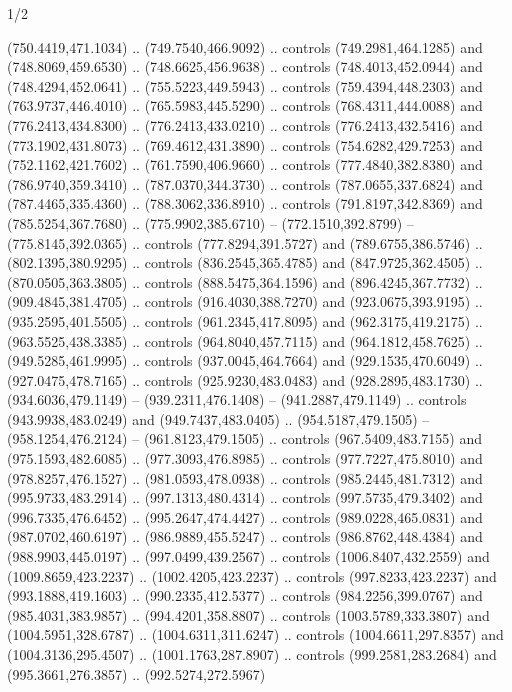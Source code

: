 \begin{flagdescription}{1/2}
\begin{scope}[shift={(2*\flaglength/3-0.25*\rb,0.51333\flagwidth)},scale=0.001715\flagwidth*\stretchfactor]
\begin{scope}[y=-1pt, x=1pt,cm={{1.04354,0.0,0.0,1.01818,(-827,-297)}}]
\begin{scope}[fill=gold]
  (750.4419,471.1034) .. (749.7540,466.9092) .. controls (749.2981,464.1285) and
  (748.8069,459.6530) .. (748.6625,456.9638) .. controls (748.4013,452.0944) and
  (748.4294,452.0641) .. (755.5223,449.5943) .. controls (759.4394,448.2303) and
  (763.9737,446.4010) .. (765.5983,445.5290) .. controls (768.4311,444.0088) and
  (776.2413,434.8300) .. (776.2413,433.0210) .. controls (776.2413,432.5416) and
  (773.1902,431.8073) .. (769.4612,431.3890) .. controls (754.6282,429.7253) and
  (752.1162,421.7602) .. (761.7590,406.9660) .. controls (777.4840,382.8380) and
  (786.9740,359.3410) .. (787.0370,344.3730) .. controls (787.0655,337.6824) and
  (787.4465,335.4360) .. (788.3062,336.8910) .. controls (791.8197,342.8369) and
  (785.5254,367.7680) .. (775.9902,385.6710) -- (772.1510,392.8799) --
  (775.8145,392.0365) .. controls (777.8294,391.5727) and (789.6755,386.5746) ..
  (802.1395,380.9295) .. controls (836.2545,365.4785) and (847.9725,362.4505) ..
  (870.0505,363.3805) .. controls (888.5475,364.1596) and (896.4245,367.7732) ..
  (909.4845,381.4705) .. controls (916.4030,388.7270) and (923.0675,393.9195) ..
  (935.2595,401.5505) .. controls (961.2345,417.8095) and (962.3175,419.2175) ..
  (963.5525,438.3385) .. controls (964.8040,457.7115) and (964.1812,458.7625) ..
  (949.5285,461.9995) .. controls (937.0045,464.7664) and (929.1535,470.6049) ..
  (927.0475,478.7165) .. controls (925.9230,483.0483) and (928.2895,483.1730) ..
  (934.6036,479.1149) -- (939.2311,476.1408) -- (941.2887,479.1149) .. controls
  (943.9938,483.0249) and (949.7437,483.0405) .. (954.5187,479.1505) --
  (958.1254,476.2124) -- (961.8123,479.1505) .. controls (967.5409,483.7155) and
  (975.1593,482.6085) .. (977.3093,476.8985) .. controls (977.7227,475.8010) and
  (978.8257,476.1527) .. (981.0593,478.0938) .. controls (985.2445,481.7312) and
  (995.9733,483.2914) .. (997.1313,480.4314) .. controls (997.5735,479.3402) and
  (996.7335,476.6452) .. (995.2647,474.4427) .. controls (989.0228,465.0831) and
  (987.0702,460.6197) .. (986.9889,455.5247) .. controls (986.8762,448.4384) and
  (988.9903,445.0197) .. (997.0499,439.2567) .. controls (1006.8407,432.2559)
  and (1009.8659,423.2237) .. (1002.4205,423.2237) .. controls
  (997.8233,423.2237) and (993.1888,419.1603) .. (990.2335,412.5377) .. controls
  (984.2256,399.0767) and (985.4031,383.9857) .. (994.4201,358.8807) .. controls
  (1003.5789,333.3807) and (1004.5951,328.6787) .. (1004.6311,311.6247) ..
  controls (1004.6611,297.8357) and (1004.3136,295.4507) .. (1001.1763,287.8907)
  .. controls (999.2581,283.2684) and (995.3661,276.3857) .. (992.5274,272.5967)

\end{scope}
\end{scope}
\end{scope}
\end{flagdescription}
